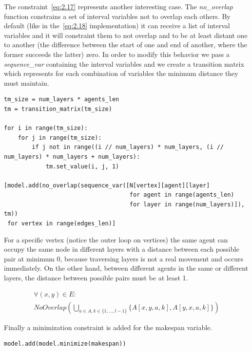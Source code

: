 \documentclass[12pt, a4paper, hidelinks]{article}
\numberwithin{equation}{section}
\begin{document}
The constraint~\ref{eq:2.17} represents another interesting case.
The \textit{no\_overlap} function constrains a set of interval variables not to overlap each others.
By default (like in the~\ref{eq:2.18} implementation) it can receive a list of interval variables and it will constraint them to not overlap and to be at least distant one to another (the difference between the start of one and end of another, where the former succeeds the latter) zero.
In order to modify this behavior we pass a \textit{sequence\_var} containing the interval variables and we create a transition matrix which represents for each combination of variables the minimum distance they must maintain.

\begin{lstlisting}[label={lst:minimize2}]
tm_size = num_layers * agents_len
tm = transition_matrix(tm_size)

for i in range(tm_size):
    for j in range(tm_size):
        if j not in range((i // num_layers) * num_layers, (i // num_layers) * num_layers + num_layers):
            tm.set_value(i, j, 1)

[model.add(no_overlap(sequence_var([N[vertex][agent][layer]
                                    for agent in range(agents_len)
                                    for layer in range(num_layers)]), tm))
 for vertex in range(edges_len)]
\end{lstlisting}

For a specific vertex (notice the outer loop on vertices) the same agent can occupy the same node in different layers with a distance between each possible pair at minimum 0, because traversing layers is not a real movement and occurs immediately.
On the other hand, between different agents in the same or different layers, the distance between possible pairs must be at least 1.

\begin{description}\label{eq:equation_set_2.5}
\item \begin{equation}\begin{split} \forall (x, y) \in E: \\ NoOverlap(\bigcup_{a \in A, k \in \{1,\dots,l-1\}} \{A[x,y,a,k], A[y,x,a,k]\})\end{split}\label{eq:2.18}\end{equation}
\end{description}

Finally a minimization constraint is added for the makespan variable.
\begin{lstlisting}[label={lst:minimize2}]
model.add(model.minimize(makespan))
\end{lstlisting}
\end{document}
